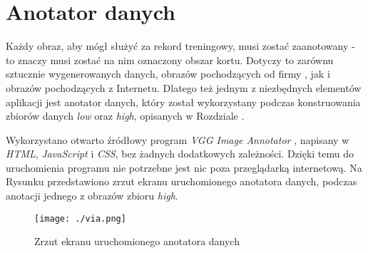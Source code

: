 \section{Anotator danych}

Każdy obraz, aby mógł służyć za rekord treningowy, musi zostać zaanotowany - to znaczy musi zostać na nim oznaczony obszar kortu.
Dotyczy to zarównu sztucznie wygenerowanych danych, obrazów pochodzących od firmy \blue{}, jak i obrazów pochodzących z Internetu.
Dlatego też jednym z niezbędnych elementów aplikacji jest anotator danych, który został wykorzystany podczas konstruowania zbiorów danych \textit{low} oraz \textit{high}, opisanych w Rozdziale .

Wykorzystano otwarto źródłowy program \textit{VGG Image Annotator} \cite{dutta2016via} \cite{dutta2019vgg}, napisany w \textit{HTML}, \textit{JavaScript} i \textit{CSS}, bez żadnych dodatkowych zależności.
Dzięki temu do uruchomienia programu nie potrzebne jest nic poza przeglądarką internetową.
Na Rysunku  przedstawiono zrzut ekranu uruchomionego anotatora danych, podczas anotacji jednego z obrazów zbioru  \textit{high}.

\vspace{1cm}

\begin{figure}[!htb]
  \texttt{[image: ./via.png]}
    \caption{Zrzut ekranu uruchomionego anotatora danych}
    \label{fig:via}
\end{figure}
